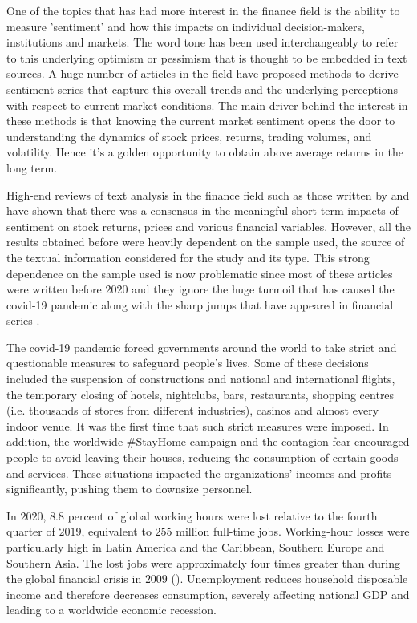 \documentclass[a4paper, 12pt]{report}
\begin{document}
    One of the topics that has had more interest in the finance field is the ability to measure 'sentiment' and how this impacts on individual decision-makers, institutions and markets. The word tone has been used interchangeably to refer to this underlying optimism or pessimism that is thought to be embedded in text sources. A huge number of articles in the field have proposed methods to derive sentiment series that capture this overall trends and the underlying perceptions with respect to current market conditions. The main driver behind the interest in these methods is that knowing the current market sentiment opens the door to understanding the dynamics of stock prices, returns, trading volumes, and volatility. Hence it's a golden opportunity to obtain above average returns in the long term. 
    
    High-end reviews of text analysis in the finance field such as those written by \textcite{Nassirtoussi:2014} and \textcite{Kearney:2014} have shown that there was a consensus in the meaningful short term impacts of sentiment on stock returns, prices and various financial variables. However, all the results obtained before were heavily dependent on the sample used, the source of the textual information considered for the study and its type. This strong dependence on the sample used is now problematic since most of these articles were written before $2020$ and they ignore the huge turmoil that has caused the covid-19 pandemic along with the sharp jumps that have appeared in financial series . 
    
    The covid-19 pandemic forced governments around the world to take strict and questionable measures to safeguard people’s lives. Some of these decisions included the suspension of constructions and national and international flights, the temporary closing of hotels, nightclubs, bars, restaurants, shopping centres (i.e. thousands of stores from different industries), casinos and almost every indoor venue. It was the first time that such strict measures were imposed. In addition, the worldwide $\#$StayHome campaign and the contagion fear encouraged people to avoid leaving their houses, reducing the consumption of certain goods and services. These situations impacted the organizations’ incomes and profits significantly, pushing them to downsize personnel. 
    
    In $2020$, $8.8$ percent of global working hours were lost relative to the fourth quarter of $2019$, equivalent to $255$ million full-time jobs. Working-hour losses were particularly high in Latin America and the Caribbean, Southern Europe and Southern Asia. The lost jobs were approximately four times greater than during the global financial crisis in $2009$ (\textcite{ILO:2021}). Unemployment reduces household disposable income and therefore decreases consumption, severely affecting national GDP and leading to a worldwide economic recession.
    
\end{document}
